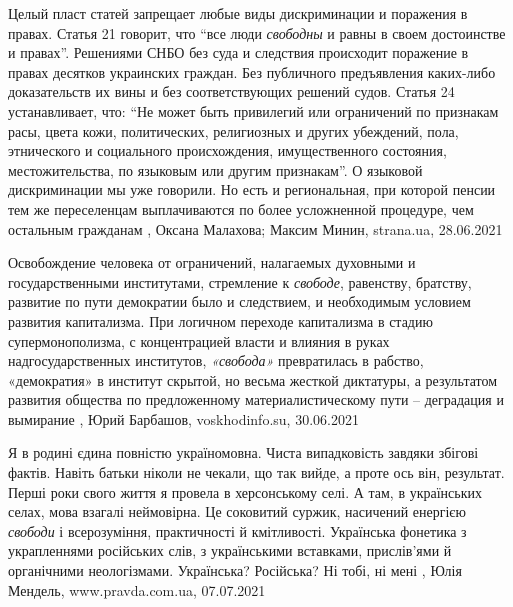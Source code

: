 Целый пласт статей запрещает любые виды дискриминации и поражения в правах.
Статья 21 говорит, что \enquote{все люди \emph{свободны} и равны в своем достоинстве и
правах}.  Решениями СНБО без суда и следствия происходит поражение в правах
десятков украинских граждан. Без публичного предъявления каких-либо
доказательств их вины и без соответствующих решений судов.  Статья 24
устанавливает, что: \enquote{Не может быть привилегий или ограничений по признакам
расы, цвета кожи, политических, религиозных и других убеждений, пола,
этнического и социального происхождения, имущественного состояния,
местожительства, по языковым или другим признакам}.  О языковой дискриминации
мы уже говорили. Но есть и региональная, при которой пенсии тем же переселенцам
выплачиваются по более усложненной процедуре, чем остальным гражданам
, 
Оксана Малахова; Максим Минин, strana.ua, 28.06.2021

Освобождение человека от ограничений, налагаемых духовными и государственными
институтами, стремление к \emph{свободе}, равенству, братству, развитие по пути
демократии было и следствием, и необходимым условием развития капитализма. При
логичном переходе капитализма в стадию супермонополизма, с концентрацией власти
и влияния в руках надгосударственных институтов, \emph{«свобода»} превратилась
в рабство, «демократия» в институт скрытой, но весьма жесткой диктатуры, а
результатом развития общества по предложенному материалистическому пути –
деградация и вымирание
, 
Юрий Барбашов, voskhodinfo.su, 30.06.2021

Я в родині єдина повністю україномовна. Чиста випадковість завдяки збігові
фактів. Навіть батьки ніколи не чекали, що так вийде, а проте ось він,
результат.  Перші роки свого життя я провела в херсонському селі. А там, в
українських селах, мова взагалі неймовірна. Це соковитий суржик, насичений
енергією \emph{свободи} і всерозуміння, практичності й кмітливості. Українська
фонетика з украпленнями російських слів, з українськими вставками, прислів’ями
й органічними неологізмами. Українська? Російська? Ні тобі, ні мені
, 
Юлія Мендель, www.pravda.com.ua, 07.07.2021

